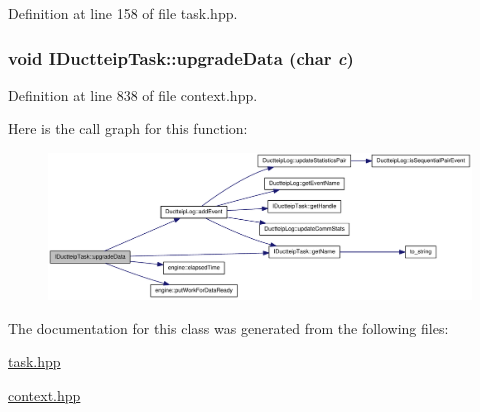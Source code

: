Definition at line 158 of file task.hpp.\hypertarget{class_i_ductteip_task_ae4ef33df082b9727f281fdaa1896bb89}{
\subsubsection[{upgradeData}]{\setlength{\rightskip}{0pt plus 5cm}void IDuctteipTask::upgradeData (char {\em c})}}
\label{class_i_ductteip_task_ae4ef33df082b9727f281fdaa1896bb89}


Definition at line 838 of file context.hpp.

Here is the call graph for this function:\nopagebreak
\begin{figure}[H]
\begin{center}
\leavevmode
\includegraphics[width=390pt]{class_i_ductteip_task_ae4ef33df082b9727f281fdaa1896bb89_cgraph}
\end{center}
\end{figure}


The documentation for this class was generated from the following files:\begin{DoxyCompactItemize}
\item 
\hyperlink{task_8hpp}{task.hpp}\item 
\hyperlink{context_8hpp}{context.hpp}\end{DoxyCompactItemize}
